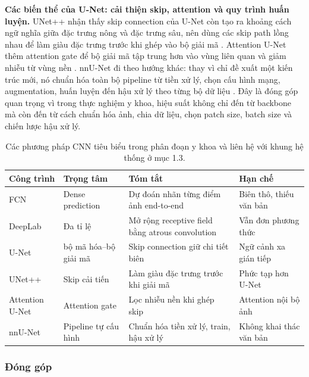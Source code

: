 \textbf{Các biến thể của U-Net: cải thiện skip, attention và quy trình huấn luyện.} UNet++ nhận thấy skip connection của U-Net còn tạo ra khoảng cách ngữ nghĩa giữa đặc trưng nông và đặc trưng sâu, nên dùng các skip path lồng nhau để làm giàu đặc trưng trước khi ghép vào bộ giải mã \cite{zhou2018unetpp}. Attention U-Net thêm attention gate để bộ giải mã tập trung hơn vào vùng liên quan và giảm nhiễu từ vùng nền \cite{oktay2018attention}. nnU-Net đi theo hướng khác: thay vì chỉ đề xuất một kiến trúc mới, nó chuẩn hóa toàn bộ pipeline từ tiền xử lý, chọn cấu hình mạng, augmentation, huấn luyện đến hậu xử lý theo từng bộ dữ liệu \cite{isensee2021nnunet}. Đây là đóng góp quan trọng vì trong thực nghiệm y khoa, hiệu suất không chỉ đến từ backbone mà còn đến từ cách chuẩn hóa ảnh, chia dữ liệu, chọn patch size, batch size và chiến lược hậu xử lý.

\begin{table}[!t]
  \centering
  \caption{Các phương pháp CNN tiêu biểu trong phân đoạn y khoa và liên hệ với khung hệ thống ở mục 1.3.}
  \label{tab:cnn-related-works}
  \scriptsize
  \renewcommand{\arraystretch}{1.15}
  \setlength{\tabcolsep}{5pt}
  \begin{tabularx}{\textwidth}{@{}l L L L@{}}
    \toprule
    Công trình & Trọng tâm & Tóm tắt & Hạn chế \\
    \midrule
    FCN \cite{long2015fcn} & Dense prediction & Dự đoán nhãn từng điểm ảnh end-to-end & Biên thô, thiếu văn bản \\
    DeepLab \cite{chen2018deeplab} & Đa tỉ lệ & Mở rộng receptive field bằng atrous convolution & Vẫn đơn phương thức \\
    U-Net \cite{ronneberger2015unet} & bộ mã hóa--bộ giải mã & Skip connection giữ chi tiết biên & Ngữ cảnh xa gián tiếp \\
    UNet++ \cite{zhou2018unetpp} & Skip cải tiến & Làm giàu đặc trưng trước khi giải mã & Phức tạp hơn U-Net \\
    Attention U-Net \cite{oktay2018attention} & Attention gate & Lọc nhiễu nền khi ghép skip & Attention nội bộ ảnh \\
    nnU-Net \cite{isensee2021nnunet} & Pipeline tự cấu hình & Chuẩn hóa tiền xử lý, train, hậu xử lý & Không khai thác văn bản \\
    \bottomrule
  \end{tabularx}
\end{table}
\FloatBarrier

\subsubsection{Đóng góp}

